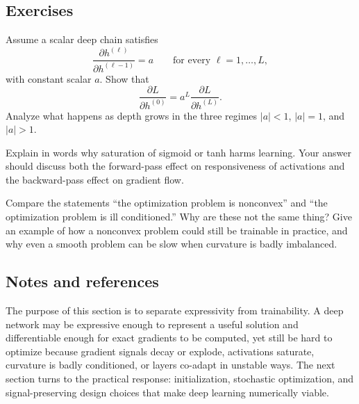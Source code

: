 \subsection*{Exercises}

\begin{exercise}
Assume a scalar deep chain satisfies
\[
\frac{\partial h^{(\ell)}}{\partial h^{(\ell-1)}}=a
\qquad\text{for every }\ell=1,\dots,L,
\]
with constant scalar \(a\).
Show that
\[
\frac{\partial L}{\partial h^{(0)}}
=
a^L\frac{\partial L}{\partial h^{(L)}}.
\]
Analyze what happens as depth grows in the three regimes \(|a|<1\), \(|a|=1\), and \(|a|>1\).
\end{exercise}

\begin{exercise}
Explain in words why saturation of sigmoid or tanh harms learning.
Your answer should discuss both the forward-pass effect on responsiveness of activations and the backward-pass effect on gradient flow.
\end{exercise}

\begin{exercise}
Compare the statements ``the optimization problem is nonconvex'' and ``the optimization problem is ill conditioned.''
Why are these not the same thing?
Give an example of how a nonconvex problem could still be trainable in practice, and why even a smooth problem can be slow when curvature is badly imbalanced.
\end{exercise}

\subsection*{Notes and references}

The purpose of this section is to separate expressivity from trainability.
A deep network may be expressive enough to represent a useful solution and differentiable enough for exact gradients to be computed, yet still be hard to optimize because gradient signals decay or explode, activations saturate, curvature is badly conditioned, or layers co-adapt in unstable ways.
The next section turns to the practical response: initialization, stochastic optimization, and signal-preserving design choices that make deep learning numerically viable.
